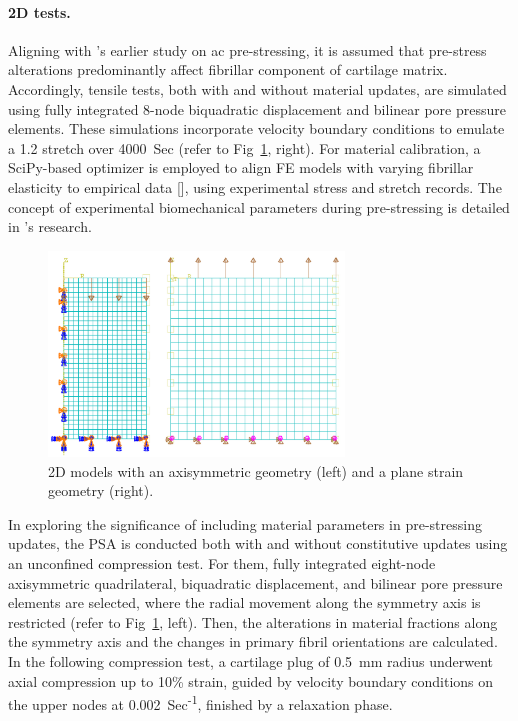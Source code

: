 \documentclass[12pt,a4paper]{report}
\begin{document}
\paragraph{2D tests.} Aligning with \cite{wang2018}'s earlier study on \ac{ac} pre-stressing, it is assumed that pre-stress alterations predominantly affect fibrillar component of cartilage matrix. Accordingly, tensile tests, both with and without material updates, are simulated using fully integrated 8-node biquadratic displacement and bilinear pore pressure elements. These simulations incorporate velocity boundary conditions to emulate a 1.2 stretch over 4000~Sec (refer to Fig~\ref{fig:fe_psa_2d}, right). For material calibration, a SciPy-based optimizer is employed to align FE models with varying fibrillar elasticity to empirical data [\cite{elliott2002}], using experimental stress and stretch records. The concept of experimental biomechanical parameters during pre-stressing is detailed in \cite{wang2018}'s research.
%
\begin{figure}\centering
\includegraphics[width=0.7\textwidth]{img/fe_psa_2d.jpg}
\caption{2D models with an axisymmetric geometry (left) and a plane strain geometry (right).}
\label{fig:fe_psa_2d}
\end{figure}

In exploring the significance of including material parameters in pre-stressing updates, the PSA is conducted both with and without constitutive updates using an unconfined compression test. For them, fully integrated eight-node axisymmetric quadrilateral, biquadratic displacement, and bilinear pore pressure elements are selected, where the radial movement along the symmetry axis is restricted (refer to Fig~\ref{fig:fe_psa_2d}, left). Then, the alterations in material fractions along the symmetry axis and the changes in primary fibril orientations are calculated. In the following compression test, a cartilage plug of 0.5~mm radius underwent axial compression up to 10\% strain, guided by velocity boundary conditions on the upper nodes at 0.002~Sec\textsuperscript{-1}, finished by a relaxation phase.
\end{document}
